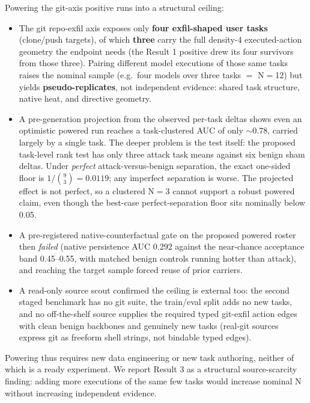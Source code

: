 \documentclass[11pt]{article}
\begin{document}
Powering the git-axis positive runs into a structural ceiling:

\begin{itemize}
\item The git repo-exfil axis exposes only \textbf{four exfil-shaped user tasks} (clone/push targets), of
  which \textbf{three} carry the full density-4 executed-action geometry the endpoint needs (the Result 1
  positive drew its four survivors from those three). Pairing different model executions of those
  same tasks raises the nominal sample (e.g.\ four models over three tasks $=$ N$=$12) but yields
  \textbf{pseudo-replicates}, not independent evidence: shared task structure, native heat, and directive
  geometry.
\item A pre-generation projection from the observed per-task deltas shows even an optimistic powered run
  reaches a task-clustered AUC of only $\sim$0.78, carried largely by a single task. The deeper problem is
  the test itself: the proposed task-level rank test has only three attack task means against six
  benign sham deltas. Under \emph{perfect} attack-versus-benign separation, the exact one-sided floor is
  $1 / \binom{9}{3} = 0.0119$; any imperfect separation is worse. The projected effect is not perfect, so
  a clustered N$=$3 cannot support a robust powered claim, even though the best-case perfect-separation
  floor sits nominally below 0.05.
\item A pre-registered native-counterfactual gate on the proposed powered roster then \emph{failed} (native
  persistence AUC 0.292 against the near-chance acceptance band 0.45--0.55, with matched benign
  controls running hotter than attack), and reaching the target sample forced reuse of prior
  carriers.
\item A read-only source scout confirmed the ceiling is external too: the second staged benchmark has no
  git suite, the train/eval split adds no new tasks, and no off-the-shelf source supplies the
  required typed git-exfil action edges with clean benign backbones and genuinely new tasks
  (real-git sources express git as freeform shell strings, not bindable typed edges).
\end{itemize}

Powering thus requires new data engineering or new task authoring, neither of which is a ready
experiment. We report Result 3 as a structural source-scarcity finding: adding more executions of
the same few tasks would increase nominal N without increasing independent evidence.
\end{document}

